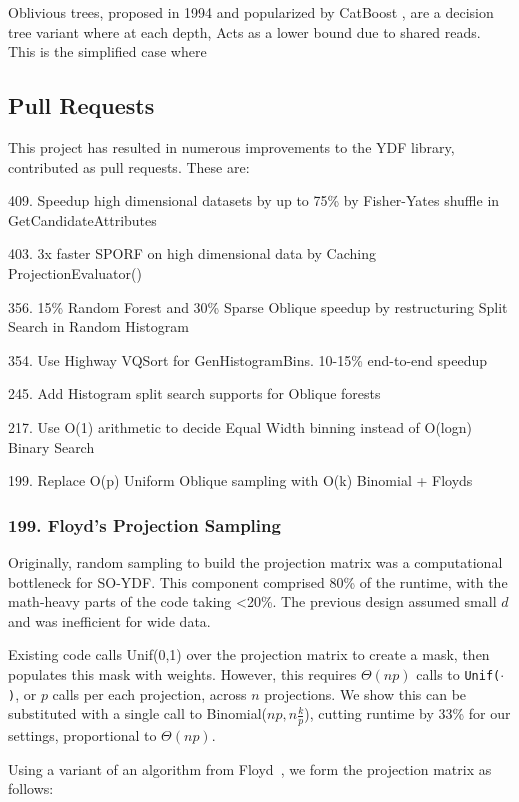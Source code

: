 \documentclass[sigconf,anonymous,review]{acmart}
\begin{document}
Oblivious trees, proposed in 1994 \cite{} and popularized by CatBoost \cite{prokhorenkova2018catboost}, are a decision tree variant where at each depth,
Acts as a lower bound due to shared reads. This is the simplified case where

\subsection{Pull Requests}

This project has resulted in numerous improvements to the YDF library, contributed as pull requests. These are:

409. Speedup high dimensional datasets by up to 75\% by Fisher-Yates shuffle in GetCandidateAttributes

403. 3x faster SPORF on high dimensional data by Caching ProjectionEvaluator()

356. 15\% Random Forest and 30\% Sparse Oblique speedup by restructuring Split Search in Random Histogram

354. Use Highway VQSort for GenHistogramBins. 10-15\% end-to-end speedup

245. Add Histogram split search supports for Oblique forests

217. Use O(1) arithmetic to decide Equal Width binning instead of O(logn) Binary Search

199. Replace O(p) Uniform Oblique sampling with O(k) Binomial + Floyds

\subsubsection{199. Floyd's Projection Sampling}
\label{app:floyds}

Originally, random sampling to build the projection matrix was a computational bottleneck for SO-YDF. This component comprised 80\% of the runtime, with the math-heavy parts of the code taking <20\%. The previous design assumed small $d$ and was inefficient for wide data.

Existing code calls Unif(0,1) over the projection matrix to create a mask, then populates this mask with weights. However, this requires $\Theta(np)$ calls to {\tt Unif($\cdot$)}, or $p$ calls per each projection, across $n$ projections. We show this can be substituted with a single call to Binomial($np, n\frac{k}{p}$), cutting runtime by 33\% for our settings, proportional to $\Theta(np)$.

Using a variant of an algorithm from Floyd~\cite{10.1145/30401.315746}, we form the projection matrix as follows:
\end{document}

